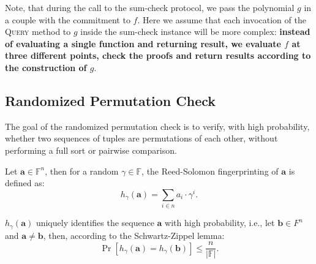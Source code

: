 \documentclass[../../book]{subfiles}
\begin{document}
\begin{remark}
    Note, that during the call to the sum-check protocol, we pass the polynomial $g$ in a couple with the 
    commitment to $f$. Here we assume that each invocation of the \textsc{Query} method to $g$ inside the 
    sum-check instance will be more complex: \textbf{instead of evaluating a single function and returning 
    result, we evaluate $f$ at three different points, check the proofs and return results according to the
    construction of $g$}.
\end{remark}

\subsection{Randomized Permutation Check}
\label{sec:randomized-permutation-check}

The goal of the randomized permutation check is to verify, with high probability, whether two sequences
of tuples are permutations of each other, without performing a full sort or pairwise comparison.

\begin{definition}
    Let $\mathbf{a} \in \mathbb{F}^{n}$, then for a random $\gamma \in \mathbb{F}$, the Reed-Solomon 
    fingerprinting of $\mathbf{a}$ is defined as:
    \begin{equation*}
        h_{\gamma}(\mathbf{a}) = \sum_{i \in n} a_i \cdot \gamma^i.
    \end{equation*}

    $h_{\gamma}(\mathbf{a})$ uniquely identifies the sequence $\mathbf{a}$ with high probability,
    i.e., let $\mathbf{b} \in F^n$ and $\mathbf{a} \neq \mathbf{b}$, then, according to the Schwartz-Zippel lemma:
    \begin{equation*}
        \Pr[h_{\gamma}(\mathbf{a}) = h_{\gamma}(\mathbf{b})] \leq \frac{n}{|\mathbb{F}|}.
    \end{equation*}
\end{definition}
\end{document}
